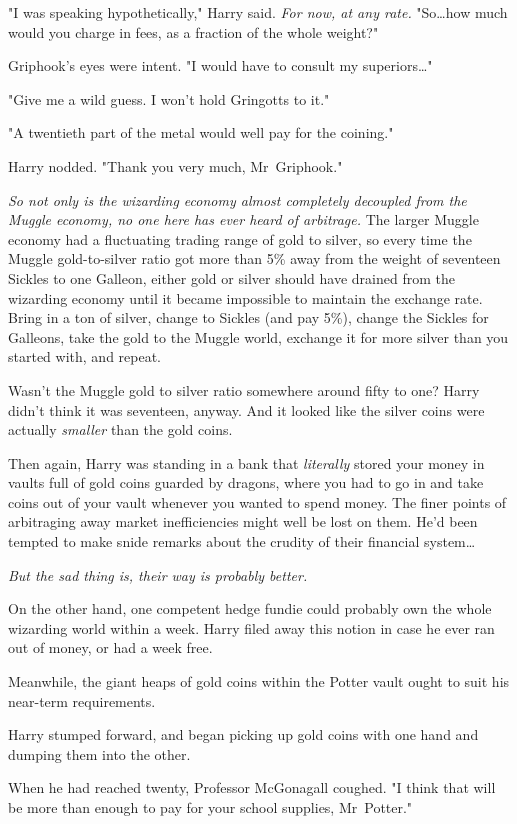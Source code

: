 "I was speaking hypothetically," Harry said. \emph{For now, at any rate.}
"So…how much would you charge in fees, as a fraction of the whole
weight?"

Griphook's eyes were intent. "I would have to consult my superiors…"

"Give me a wild guess. I won't hold Gringotts to it."

"A twentieth part of the metal would well pay for the coining."

Harry nodded. "Thank you very much, Mr~Griphook."

\emph{So not only is the wizarding economy almost completely decoupled from the
Muggle economy, no one here has ever heard of arbitrage.} The larger Muggle
economy had a fluctuating trading range of gold to silver, so every time the
Muggle gold-to-silver ratio got more than 5\% away from the weight of seventeen
Sickles to one Galleon, either gold or silver should have drained from the
wizarding economy until it became impossible to maintain the exchange rate.
Bring in a ton of silver, change to Sickles (and pay 5\%), change the Sickles
for Galleons, take the gold to the Muggle world, exchange it for more silver
than you started with, and repeat.

Wasn't the Muggle gold to silver ratio somewhere around fifty to one? Harry
didn't think it was seventeen, anyway. And it looked like the silver coins were
actually \emph{smaller} than the gold coins.

Then again, Harry was standing in a bank that \emph{literally} stored your
money in vaults full of gold coins guarded by dragons, where you had to go in
and take coins out of your vault whenever you wanted to spend money. The finer
points of arbitraging away market inefficiencies might well be lost on them.
He'd been tempted to make snide remarks about the crudity of their financial
system…

\emph{But the sad thing is, their way is probably better.}

On the other hand, one competent hedge fundie could probably own the whole
wizarding world within a week. Harry filed away this notion in case he ever ran
out of money, or had a week free.

Meanwhile, the giant heaps of gold coins within the Potter vault ought to suit
his near-term requirements.

Harry stumped forward, and began picking up gold coins with one hand and
dumping them into the other.

When he had reached twenty, Professor McGonagall coughed. "I think that will be
more than enough to pay for your school supplies, Mr~Potter."

